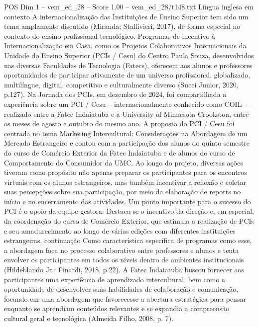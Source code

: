 \begin{textsample}{POS Dim 1 – vem\_ed\_28 – Score 1.00 – vem\_ed\_28/t148.txt}  \label{ex:f1_pos_051}
Língua inglesa em contexto A internacionalização das Instituições de Ensino Superior tem sido um tema amplamente discutido (Miranda; Stallivieri, 2017), de forma especial no contexto do ensino profissional tecnológico.
Programas de incentivo à Internacionalização em Casa, como os Projetos Colaborativos Internacionais da Unidade do Ensino Superior (PCIs / Cesu) do Centro Paula Souza, desenvolvidos nas diversas Faculdades de Tecnologia (Fatecs), oferecem aos alunos e professores oportunidades de participar ativamente de um universo profissional, globalizado, multilíngue, digital, competitivo e culturalmente diverso (Succi Junior, 2020, p.127).
Na Jornada dos PCIs, em dezembro de 2024, foi compartilhada a experiência sobre um PCI / Cesu – internacionalmente conhecido como COIL – realizado entre a Fatec Indaiatuba e a University of Minnesota Crookston, entre os meses de agosto e outubro do mesmo ano.
A proposta do PCI / Cesu foi centrada no tema Marketing Intercultural: Considerações na Abordagem de um Mercado Estrangeiro e contou com a participação dos alunos do quinto semestre do curso de Comércio Exterior da Fatec Indaiatuba e de alunos do curso de Comportamento do Consumidor da UMC.
Ao longo do projeto, diversas ações tiveram como propósito não apenas preparar os participantes para os encontros virtuais com os alunos estrangeiros, mas também incentivar a reflexão e coletar suas percepções sobre sua participação, por meio da elaboração de reports no início e no encerramento das atividades.
Um ponto importante para o sucesso do PCI é o apoio da equipe gestora.
Destaca-se o incentivo da direção e, em especial, da coordenação do curso de Comércio Exterior, que estimula a realização de PCIs e seu amadurecimento ao longo de várias edições com diferentes instituições estrangeiras. continuação Como característica específica de programas como esse, a abordagem foca no processo colaborativo entre professores e alunos e tenta envolver os participantes em todos os níveis dentro de ambientes institucionais (Hildeblando Jr.; Finardi, 2018, p.22).
A Fatec Indaiatuba buscou fornecer aos participantes uma experiência de aprendizado intercultural, bem como a oportunidade de desenvolver suas habilidades de colaboração e comunicação, focando em uma abordagem que favorecesse a abertura estratégica para pensar enquanto se aprendiam conteúdos relevantes e se expandia a compreensão cultural geral e tecnológica (Almeida Filho, 2008, p. 7).

\end{textsample}
